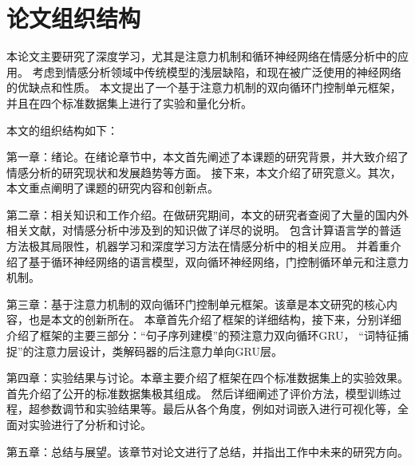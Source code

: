 \section{论文组织结构}
本论文主要研究了深度学习，尤其是注意力机制和循环神经网络在情感分析中的应用。
考虑到情感分析领域中传统模型的浅层缺陷，和现在被广泛使用的神经网络的优缺点和性质。
本文提出了一个基于注意力机制的双向循环门控制单元框架，并且在四个标准数据集上进行了实验和量化分析。

本文的组织结构如下：

第一章：绪论。在绪论章节中，本文首先阐述了本课题的研究背景，并大致介绍了情感分析的研究现状和发展趋势等方面。
接下来，本文介绍了研究意义。其次，本文重点阐明了课题的研究内容和创新点。

第二章：相关知识和工作介绍。在做研究期间，本文的研究者查阅了大量的国内外相关文献，对情感分析中涉及到的知识做了详尽的说明。
包含计算语言学的普适方法极其局限性，机器学习和深度学习方法在情感分析中的相关应用。
并着重介绍了基于循环神经网络的语言模型，双向循环神经网络，门控制循环单元和注意力机制。

第三章：基于注意力机制的双向循环门控制单元框架。该章是本文研究的核心内容，也是本文的创新所在。
本章首先介绍了框架的详细结构，接下来，分别详细介绍了框架的主要三部分：“句子序列建模”的预注意力双向循环GRU，
“词特征捕捉”的注意力层设计，类解码器的后注意力单向GRU层。

第四章：实验结果与讨论。本章主要介绍了框架在四个标准数据集上的实验效果。首先介绍了公开的标准数据集极其组成。
然后详细阐述了评价方法，模型训练过程，超参数调节和实验结果等。最后从各个角度，例如对词嵌入进行可视化等，全面对实验进行了分析和讨论。

第五章：总结与展望。该章节对论文进行了总结，并指出工作中未来的研究方向。
